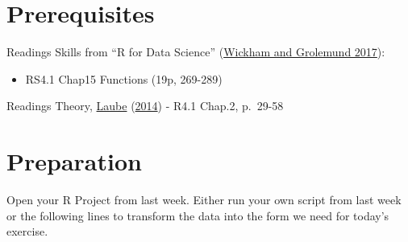 \documentclass[
]{book}
\providecommand{\tightlist}{%
  \setlength{\itemsep}{0pt}\setlength{\parskip}{0pt}}
\begin{document}
\hypertarget{prerequisites-3}{%
\section{Prerequisites}\label{prerequisites-3}}

Readings Skills from ``R for Data Science'' (\protect\hyperlink{ref-wickham2017}{Wickham and Grolemund 2017}):

\begin{itemize}
\tightlist
\item
  RS4.1 Chap15 Functions (19p, 269-289)
\end{itemize}

Readings Theory, \protect\hyperlink{ref-laube2014}{Laube} (\protect\hyperlink{ref-laube2014}{2014})
- R4.1 Chap.2, p.~29-58

\hypertarget{preparation}{%
\section{Preparation}\label{preparation}}

Open your R Project from last week. Either run your own script from last week or the following lines to transform the data into the form we need for today's exercise.
\end{document}
